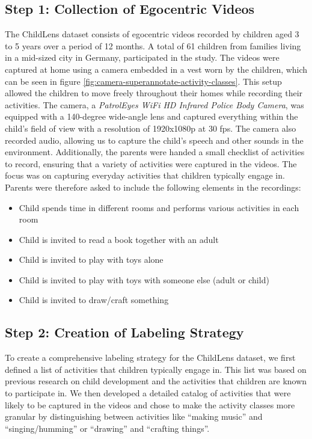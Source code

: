 \documentclass[
  man,floatsintext]{apa6}
\providecommand{\tightlist}{%
  \setlength{\itemsep}{0pt}\setlength{\parskip}{0pt}}
\begin{document}
\subsection{Step 1: Collection of Egocentric Videos}\label{step-1-collection-of-egocentric-videos}

The ChildLens dataset consists of egocentric videos recorded by children aged 3 to 5 years over a period of 12 months. A total of 61 children from families living in a mid-sized city in Germany, participated in the study. The videos were captured at home using a camera embedded in a vest worn by the children, which can be seen in figure \ref{fig:camera-superannotate-activity-classes}. This setup allowed the children to move freely throughout their homes while recording their activities. The camera, a \emph{PatrolEyes WiFi HD Infrared Police Body Camera}, was equipped with a 140-degree wide-angle lens and captured everything within the child's field of view with a resolution of 1920x1080p at 30 fps. The camera also recorded audio, allowing us to capture the child's speech and other sounds in the environment. Additionally, the parents were handed a small checklist of activities to record, ensuring that a variety of activities were captured in the videos. The focus was on capturing everyday activities that children typically engage in. Parents were therefore asked to include the following elements in the recordings:

\begin{itemize}
\tightlist
\item
  Child spends time in different rooms and performs various activities in each room
\item
  Child is invited to read a book together with an adult
\item
  Child is invited to play with toys alone
\item
  Child is invited to play with toys with someone else (adult or child)
\item
  Child is invited to draw/craft something
\end{itemize}

\subsection{Step 2: Creation of Labeling Strategy}\label{step-2-creation-of-labeling-strategy}

To create a comprehensive labeling strategy for the ChildLens dataset, we first defined a list of activities that children typically engage in. This list was based on previous research on child development and the activities that children are known to participate in. We then developed a detailed catalog of activities that were likely to be captured in the videos and chose to make the activity classes more granular by distinguishing between activities like ``making music'' and ``singing/humming'' or ``drawing'' and ``crafting things''.
\end{document}
